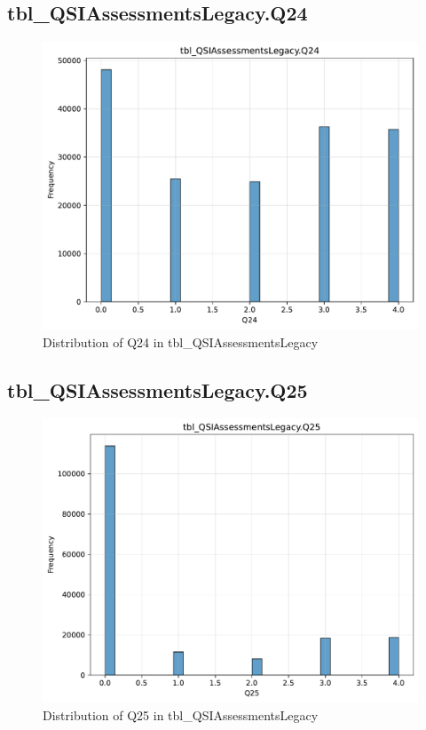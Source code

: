 \subsection{tbl\_QSIAssessmentsLegacy.Q24}

\begin{figure}[htbp]
\centering
\includegraphics[width=\textwidth]{figures/dbo_tbl_QSIAssessmentsLegacy_Q24.pdf}
\caption{Distribution of Q24 in tbl\_QSIAssessmentsLegacy}
\end{figure}\newpage

\subsection{tbl\_QSIAssessmentsLegacy.Q25}

\begin{figure}[htbp]
\centering
\includegraphics[width=\textwidth]{figures/dbo_tbl_QSIAssessmentsLegacy_Q25.pdf}
\caption{Distribution of Q25 in tbl\_QSIAssessmentsLegacy}
\end{figure}\newpage


